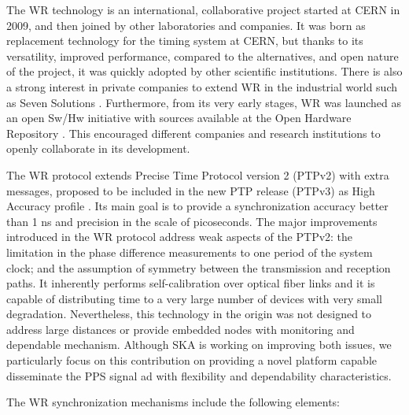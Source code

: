 The WR technology \cite{Wlostowski2011} is an international, collaborative project started at CERN in 2009, and then joined by other laboratories and companies. It was born as replacement technology for the timing system at CERN, but thanks to its versatility, improved performance, compared to the alternatives, and open nature of the project, it was quickly adopted by other scientific institutions. There is also a strong interest in private companies to extend WR in the industrial world such as Seven Solutions \cite{sevensols:wr}. Furthermore, from its very early stages, WR was launched as an open Sw/Hw initiative with sources available at the Open Hardware Repository \cite{ohwr:repo}. This encouraged different companies and research institutions to openly collaborate in its development.

The WR protocol extends Precise Time Protocol version 2 (PTPv2) with extra messages, proposed to be included in the new PTP release (PTPv3) as High Accuracy profile \cite{wr:maciej-ptpv3-standard}
. Its main goal is to provide a synchronization accuracy better than 1 ns and precision in the scale of picoseconds. The major improvements introduced in the WR protocol address weak aspects of the PTPv2: the limitation in the phase difference measurements to one period of the system clock; and the assumption of symmetry between the transmission and reception paths. It inherently performs self-calibration over optical fiber links and it is capable of distributing time to a very large number of devices with very small degradation. Nevertheless, this technology in the origin was not designed to address large distances or provide embedded nodes with monitoring and dependable mechanism. Although SKA is working on improving both issues, we particularly focus on this contribution on providing a novel platform capable disseminate the PPS signal ad with flexibility and dependability characteristics.  

The WR synchronization mechanisms include the following elements:

